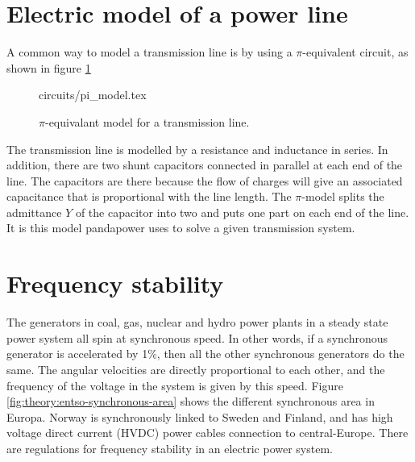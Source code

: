 \documentclass[class=book, crop=false]{standalone}
\begin{document}
\section{Electric model of a power line}\label{section:pi_model}
A common way to model a transmission line is by using a $\pi$-equivalent circuit, as shown in figure \ref{fig:theory:PI_model}

\begin{figure}[ht!]
    \center
    {circuits/pi_model.tex}
    \caption{$\pi$-equivalant model for a transmission line.}
    \label{fig:theory:PI_model}
\end{figure}

The transmission line is modelled by a resistance and inductance in series. In addition, there are two shunt capacitors connected in parallel at each end of the line. The capacitors are there because the flow of charges will give an associated capacitance that is proportional with the line length. The $\pi$-model splits the admittance $Y$ of the capacitor into two and puts one part on each end of the line. It is this model pandapower uses to solve a given transmission system. 

\section{Frequency stability}
The generators in coal, gas, nuclear and hydro power plants in a steady state power system all spin at synchronous speed. In other words, if a synchronous generator is accelerated by 1\%, then all the other synchronous generators do the same. The angular velocities are directly proportional to each other, and the frequency of the voltage in the system is given by this speed. Figure \ref{fig:theory:entso-synchronous-area} shows the different synchronous area in Europa. Norway is synchronously linked to Sweden and Finland, and has high voltage direct current (HVDC) power cables connection to central-Europe. There are regulations for frequency stability in an electric power system.
\end{document}

